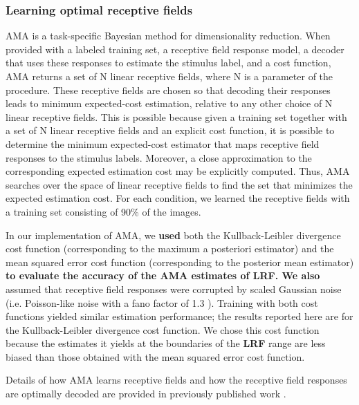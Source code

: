 \documentclass{jov}
\providecommand{\DIFaddtex}[1]{{\bf #1}} %
\providecommand{\DIFdeltex}[1]{} %
\providecommand{\DIFaddbegin}{} %
\providecommand{\DIFaddend}{} %
\providecommand{\DIFdelbegin}{} %
\providecommand{\DIFdelend}{} %
\providecommand{\DIFadd}[1]{\texorpdfstring{\DIFaddtex{#1}}{#1}} %
\providecommand{\DIFdel}[1]{\texorpdfstring{\DIFdeltex{#1}}{}} %
\newcommand{\DIFscaledelfig}{0.5}
\newlength{\DIFdelgraphicswidth} %
\newlength{\DIFdelgraphicsheight} %
\newcommand{\DIFaddincludegraphics}[2][]{{\color{blue}\fbox{\DIFOincludegraphics[#1]{#2}}}} %
\newcommand{\DIFdelincludegraphics}[2][]{%
\sbox{\DIFdelgraphicsbox}{\DIFOincludegraphics[#1]{#2}}%
\settoboxwidth{\DIFdelgraphicswidth}{\DIFdelgraphicsbox} %
\settoboxtotalheight{\DIFdelgraphicsheight}{\DIFdelgraphicsbox} %
\scalebox{\DIFscaledelfig}{%
\parbox[b]{\DIFdelgraphicswidth}{\usebox{\DIFdelgraphicsbox}\\[-\baselineskip] \rule{\DIFdelgraphicswidth}{0em}}\llap{\resizebox{\DIFdelgraphicswidth}{\DIFdelgraphicsheight}{%
\setlength{\unitlength}{\DIFdelgraphicswidth}%
\begin{picture}(1,1)%
\thicklines\linethickness{2pt} %
{\color[rgb]{1,0,0}\put(0,0){\framebox(1,1){}}}%
{\color[rgb]{1,0,0}\put(0,0){\line( 1,1){1}}}%
{\color[rgb]{1,0,0}\put(0,1){\line(1,-1){1}}}%
\end{picture}%
}\hspace*{3pt}}} %
} %
\DeclareRobustCommand{\DIFaddbegin}{\DIFOaddbegin \let\includegraphics\DIFaddincludegraphics} %
\DeclareRobustCommand{\DIFaddend}{\DIFOaddend \let\includegraphics\DIFOincludegraphics} %
\DeclareRobustCommand{\DIFdelbegin}{\DIFOdelbegin \let\includegraphics\DIFdelincludegraphics} %
\DeclareRobustCommand{\DIFdelend}{\DIFOaddend \let\includegraphics\DIFOincludegraphics} %
\begin{document}
\subsubsection*{Learning optimal receptive fields}
AMA is a task-specific Bayesian method for dimensionality reduction.
When provided with a labeled training set, a receptive field response model, a decoder that uses these responses to estimate the stimulus label, and a cost function, AMA returns a set of N linear receptive fields, where N is a parameter of the procedure.
These receptive fields are chosen so that decoding their responses leads to minimum expected-cost estimation, relative to any other choice of N linear receptive fields.
This is possible because given a training set together with a set of N linear receptive fields and an explicit cost function, it is possible to determine the minimum expected-cost estimator that maps receptive field responses to the stimulus labels.
Moreover, a close approximation to the corresponding expected estimation cost may be explicitly computed.
Thus, AMA searches over the space of linear receptive fields to find the set that minimizes the expected estimation cost.
For each condition, we learned the receptive fields with a training set consisting of 90\% of the images.

In our implementation of AMA, we \DIFdelbegin \DIFdel{explored }\DIFdelend \DIFaddbegin \DIFadd{used }\DIFaddend both the Kullback-Leibler divergence cost function (corresponding to the maximum a posteriori estimator) and the mean squared error cost function (corresponding to the posterior mean estimator) \DIFdelbegin \DIFdel{and }\DIFdelend \DIFaddbegin \DIFadd{to evaluate the accuracy of the AMA estimates of LRF. We also }\DIFaddend assumed that receptive field responses were corrupted by scaled Gaussian noise (i.e. Poisson-like noise with a fano factor of 1.3  \DIFaddbegin \DIFadd{}\DIFaddend ). 
Training with both cost functions yielded similar estimation performance; the results reported here are for the Kullback-Leibler divergence cost function.
We chose this cost function because the estimates it yields at the boundaries of the \DIFdelbegin \DIFdel{LRV }\DIFdelend \DIFaddbegin \DIFadd{LRF }\DIFaddend range are less biased than those obtained with the mean squared error cost function.

Details of how AMA learns receptive fields and how the receptive field responses are optimally decoded are provided in previously published work \cite{geisler2009optimal,burge2017accuracy,jaini2017linking}.
\end{document}

